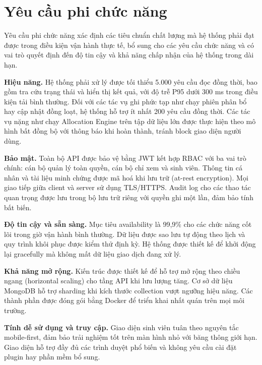 \documentclass[a4paper,12pt,openany,oneside]{report}
\begin{document}
\section{Yêu cầu phi chức năng}
\label{sec:nonfunctional}

Yêu cầu phi chức năng xác định các tiêu chuẩn chất lượng mà hệ thống phải đạt
được trong điều kiện vận hành thực tế, bổ sung cho các yêu cầu chức năng và có
vai trò quyết định đến độ tin cậy và khả năng chấp nhận của hệ thống trong dài
hạn.

\textbf{Hiệu năng.} Hệ thống phải xử lý được tối thiểu 5.000 yêu cầu đọc đồng
thời, bao gồm tra cứu trạng thái và hiển thị kết quả, với độ trễ P95 dưới 300 ms
trong điều kiện tải bình thường. Đối với các tác vụ ghi phức tạp như chạy phiên
phân bổ hay cập nhật đồng loạt, hệ thống hỗ trợ ít nhất 200 yêu cầu đồng thời.
Các tác vụ nặng như chạy Allocation Engine trên tập dữ liệu lớn được thực hiện
theo mô hình bất đồng bộ với thông báo khi hoàn thành, tránh block giao diện
người dùng.

\textbf{Bảo mật.} Toàn bộ API được bảo vệ bằng JWT kết hợp RBAC với ba vai trò
chính: cán bộ quản lý toàn quyền, cán bộ chỉ xem và sinh viên. Thông tin cá
nhân và tài liệu minh chứng được mã hoá khi lưu trữ (at-rest encryption). Mọi
giao tiếp giữa client và server sử dụng TLS/HTTPS. Audit log cho các thao tác
quan trọng được lưu trong bộ lưu trữ riêng với quyền ghi một lần, đảm bảo tính
bất biến.

\textbf{Độ tin cậy và sẵn sàng.} Mục tiêu availability là 99,9\% cho các chức
năng cốt lõi trong giờ vận hành bình thường. Dữ liệu được sao lưu tự động theo
lịch và quy trình khôi phục được kiểm thử định kỳ. Hệ thống được thiết kế để
khởi động lại gracefully mà không mất dữ liệu giao dịch đang xử lý.

\textbf{Khả năng mở rộng.} Kiến trúc được thiết kế để hỗ trợ mở rộng theo chiều
ngang (horizontal scaling) cho tầng API khi lưu lượng tăng. Cơ sở dữ liệu
MongoDB hỗ trợ sharding khi kích thước collection vượt ngưỡng hiệu năng. Các
thành phần được đóng gói bằng Docker để triển khai nhất quán trên mọi môi trường.

\textbf{Tính dễ sử dụng và truy cập.} Giao diện sinh viên tuân theo nguyên tắc
mobile-first, đảm bảo trải nghiệm tốt trên màn hình nhỏ với băng thông giới hạn.
Giao diện hỗ trợ đầy đủ các trình duyệt phổ biến và không yêu cầu cài đặt plugin
hay phần mềm bổ sung.
\end{document}
